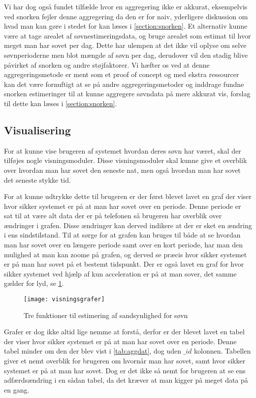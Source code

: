 Vi har dog også fundet tilfælde hvor en aggregering ikke er akkurat, eksempelvis ved snorken fejler denne aggregering da den er for naiv, yderligere diskussion om hvad man kan gøre i stedet for kan læses i \cref{section:snorken}.
Et alternativ kunne være at tage arealet af søvnestimeringsdata, og bruge arealet som estimat til hvor meget man har sovet per dag.
Dette har ulempen at det ikke vil oplyse om selve søvnperioderne men blot mængde af søvn per dag, derudover vil den stadig blive påvirket af snorken og andre støjfaktorer.
Vi hæfter os ved at denne aggregeringsmetode er ment som et proof of concept og med ekstra ressourcer kan det være fornuftigt at se på andre aggregeringsmetoder og inddrage fundne snorken estimeringer til at kunne aggregere søvndata på mere akkurat vis, forslag til dette kan læses i \cref{section:snorken}.

\subsection{Visualisering}\label{sec:pocVis}
For at kunne vise brugeren af systemet hvordan deres søvn har været, skal der tilføjes nogle visningsmoduler.
Disse visningsmoduler skal kunne give et overblik over hvordan man har sovet den seneste nat, men også hvordan man har sovet det seneste stykke tid.

For at kunne udtrykke dette til brugeren er der først blevet lavet en graf der viser hvor sikker systemet er på at man har sovet over en periode.
Denne periode er sat til at være alt data der er på telefonen så brugeren har overblik over ændringer i grafen.
Disse ændringer kan derved indikere at der er sket en ændring i ens sindstilstand.
Til at sørge for at grafen kan bruges til både at se hvordan man har sovet over en længere periode samt over en kort periode, har man den mulighed at man kan zoome på grafen, og derved se præcis hvor sikker systemet er på man har sovet på et bestemt tidspunkt.
Der er også lavet en graf for hvor sikker systemet ved hjælp af kun acceleration er på at man sover, det samme gælder for lyd, se \cref{fig:visningsgrafer}.

\begin{figure}[h]
	\centering
	\texttt{[image: visningsgrafer]}
	\caption{Tre funktioner til estimering af sandsynlighed for søvn}\label{fig:visningsgrafer}
\end{figure}

Grafer er dog ikke altid lige nemme at forstå, derfor er der blevet lavet en tabel der viser hvor sikker systemet er på at man har sovet over en periode.
Denne tabel minder om den der blev vist i \cref{tab:aggdat}, dog uden $\_id$ kolonnen.
Tabellen giver et nemt overblik for brugeren om hvornår man har sovet, samt hvor sikker systemet er på at man har sovet.
Dog er det ikke så nemt for brugeren at se ens adfærdsændring i en sådan tabel, da det kræver at man kigger på meget data på en gang.
